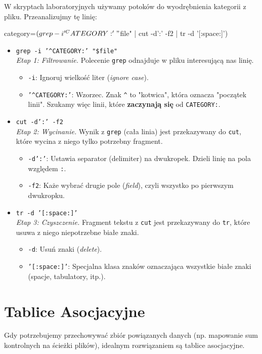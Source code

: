 W skryptach laboratoryjnych używamy potoków do wyodrębnienia kategorii z pliku. Przeanalizujmy tę linię:
\begin{terminal}
category=$(grep -i '^CATEGORY:' "$file" | cut -d':' -f2 | tr -d '[:space:]')
\end{terminal}
\begin{itemize}
    \item \texttt{grep -i '\textasciicircum CATEGORY:' "\$file"} \\
    \textit{Etap 1: Filtrowanie.} Polecenie \texttt{grep} odnajduje w pliku interesującą nas linię.
    \begin{itemize}
        \item \texttt{-i}: Ignoruj wielkość liter (\textit{ignore case}).
        \item \texttt{'\textasciicircum CATEGORY:'}: Wzorzec. Znak \texttt{\textasciicircum} to "kotwica", która oznacza "początek linii". Szukamy więc linii, które \textbf{zaczynają się} od \texttt{CATEGORY:}.
    \end{itemize}
    
    \item \texttt{cut -d':' -f2} \\
    \textit{Etap 2: Wycinanie.} Wynik z \texttt{grep} (cała linia) jest przekazywany do \texttt{cut}, które wycina z niego tylko potrzebny fragment.
    \begin{itemize}
        \item \texttt{-d':'}: Ustawia separator (delimiter) na dwukropek. Dzieli linię na pola względem \texttt{:}.
        \item \texttt{-f2}: Każe wybrać drugie pole (\textit{field}), czyli wszystko po pierwszym dwukropku.
    \end{itemize}
    
    \item \texttt{tr -d '[:space:]'} \\
    \textit{Etap 3: Czyszczenie.} Fragment tekstu z \texttt{cut} jest przekazywany do \texttt{tr}, które usuwa z niego niepotrzebne białe znaki.
    \begin{itemize}
        \item \texttt{-d}: Usuń znaki (\textit{delete}).
        \item \texttt{'[:space:]'}: Specjalna klasa znaków oznaczająca wszystkie białe znaki (spacje, tabulatory, itp.).
    \end{itemize}
\end{itemize}

\section{Tablice Asocjacyjne}
Gdy potrzebujemy przechowywać zbiór powiązanych danych (np. mapowanie sum kontrolnych na ścieżki plików), idealnym rozwiązaniem są tablice asocjacyjne.

